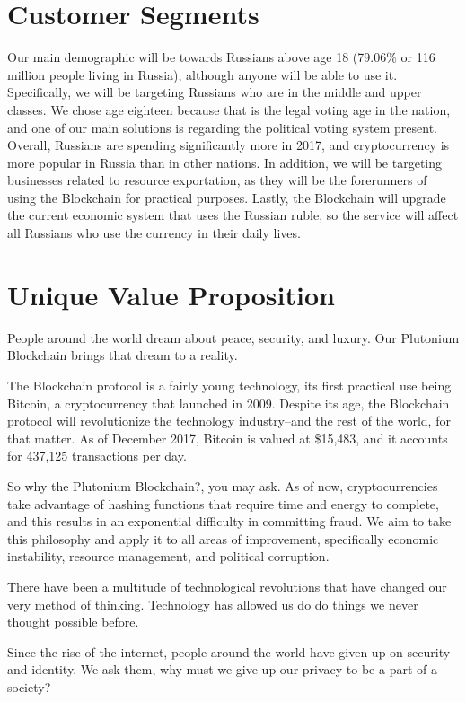 \documentclass[12pt]{article}
\begin{document}
\section{Customer Segments}
Our main demographic will be towards Russians above age 18 (79.06\% or 116 million people living in Russia), although anyone will be able to use it. Specifically, we will be targeting Russians who are in the middle and upper classes. We chose age eighteen because that is the legal voting age in the nation, and one of our main solutions is regarding the political voting system present. Overall, Russians are spending significantly more in 2017, and cryptocurrency is more popular in Russia than in other nations. In addition, we will be targeting businesses related to resource exportation, as they will be the forerunners of using the Blockchain for practical purposes. Lastly, the Blockchain will upgrade the current economic system that uses the Russian ruble, so the service will affect all Russians who use the currency in their daily lives.
\pagebreak
\section{Unique Value Proposition}
People around the world dream about peace, security, and luxury. Our Plutonium Blockchain brings that dream to a reality.

The Blockchain protocol is a fairly young technology, its first practical use being Bitcoin, a cryptocurrency that launched in 2009. Despite its age, the Blockchain protocol will revolutionize the technology industry--and the rest of the world, for that matter. As of December 2017, Bitcoin is valued at \$15,483, and it accounts for 437,125 transactions per day.

So why the Plutonium Blockchain?, you may ask. As of now, cryptocurrencies take advantage of hashing functions that require time and energy to complete, and this results in an exponential difficulty in committing fraud. We aim to take this philosophy and apply it to all areas of improvement, specifically economic instability, resource management, and political corruption.

There have been a multitude of technological revolutions that have changed our very method of thinking. Technology has allowed us do do things we never thought possible before. 

Since the rise of the internet, people around the world have given up on security and identity. We ask them, why must we give up our privacy to be a part of a society?
\pagebreak
\end{document}
